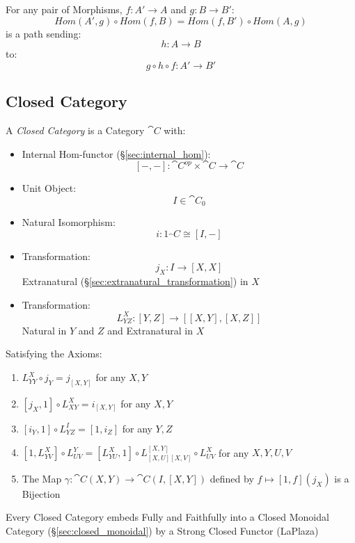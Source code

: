 For any pair of Morphisms, $f : A' \rightarrow A$ and $g : B
\rightarrow B'$:
\[
  Hom(A',g) \circ Hom(f,B) = Hom(f,B') \circ Hom(A,g)
\]
is a path sending:
\[
  h : A \rightarrow B
\]
to:
\[
  g \circ h \circ f : A' \rightarrow B'
\]



\subsection{Closed Category}\label{sec:closed_category}

A \emph{Closed Category} is a Category $\cat{C}$ with:
\begin{itemize}
  \item Internal Hom-functor (\S\ref{sec:internal_hom}):
    \[
      [-,-]:\cat{C}^{op} \times \cat{C} \rightarrow \cat{C}
    \]
  \item Unit Object:
    \[
      I \in \cat{C}_0
    \]
  \item Natural Isomorphism:
    \[
      i : 1_\cat{C} \cong [I,-]
    \]
  \item Transformation:
    \[
      j_X : I \rightarrow [X,X]
    \]
    Extranatural (\S\ref{sec:extranatural_transformation}) in $X$
  \item Transformation:
    \[
      L_{Y Z}^X : [Y,Z] \rightarrow [[X,Y],[X,Z]]
    \]
    Natural in $Y$ and $Z$ and Extranatural in $X$
\end{itemize}
Satisfying the Axioms:
\begin{enumerate}
  \item $L_{Y Y}^X \circ j_Y = j_{[X,Y]}$ for any $X,Y$
  \item $[j_X,1] \circ L_{X Y}^X = i_{[X,Y]}$ for any $X,Y$
  \item $[i_Y,1] \circ L_{Y Z}^I = [1,i_Z]$ for any $Y,Z$
  \item $[1,L_{Y V}^X] \circ L_{U V}^Y = [L_{Y U}^X,1] \circ L_{[X,U]
    [X,V]}^{[X,Y]} \circ L_{U V}^X$ for any $X,Y,U,V$
  \item The Map $\gamma : \cat{C}(X,Y) \rightarrow \cat{C}(I,[X,Y])$
    defined by $f \mapsto [1,f](j_X)$ is a Bijection
\end{enumerate}

Every Closed Category embeds Fully and Faithfully into a Closed
Monoidal Category (\S\ref{sec:closed_monoidal}) by a Strong Closed
Functor (LaPlaza) %



